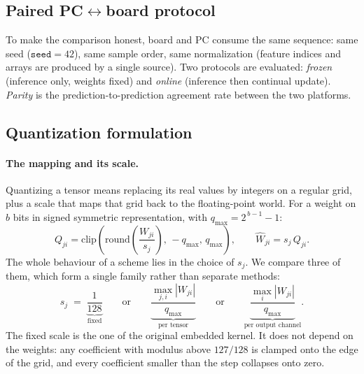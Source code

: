 \subsection{Paired PC$\leftrightarrow$board protocol}

To make the comparison honest, board and PC consume the same sequence: same seed ($\texttt{seed}=42$),
same sample order, same normalization (feature indices and arrays are produced by a single source). Two
protocols are evaluated: \emph{frozen} (inference only, weights fixed) and \emph{online} (inference then
continual update). \emph{Parity} is the prediction-to-prediction agreement rate between the two platforms.

\subsection{Quantization formulation}
\label{sec:quant_formulation}

\paragraph{The mapping and its scale.} Quantizing a tensor means replacing its real values by integers
on a regular grid, plus a scale that maps that grid back to the floating-point world. For a weight on
$b$ bits in signed symmetric representation, with $q_{\max} = 2^{\,b-1} - 1$:
\begin{equation}
\label{eq:quant_map}
Q_{ji} = \mathrm{clip}\!\left( \mathrm{round}\!\left( \frac{W_{ji}}{s_j} \right),\, -q_{\max},\, q_{\max} \right),
\qquad
\widehat{W}_{ji} = s_j \, Q_{ji} .
\end{equation}
The whole behaviour of a scheme lies in the choice of $s_j$. We compare three of them, which form a
single family rather than separate methods:
\begin{equation}
\label{eq:scale_gran}
s_j \;=\;
\underbrace{\frac{1}{128}}_{\text{fixed}}
\qquad\text{or}\qquad
\underbrace{\frac{\max_{j,i} |W_{ji}|}{q_{\max}}}_{\text{per tensor}}
\qquad\text{or}\qquad
\underbrace{\frac{\max_i |W_{ji}|}{q_{\max}}}_{\text{per output channel}} .
\end{equation}
The fixed scale is the one of the original embedded kernel. It does not depend on the weights: any
coefficient with modulus above $127/128$ is clamped onto the edge of the grid, and every coefficient
smaller than the step collapses onto zero.

